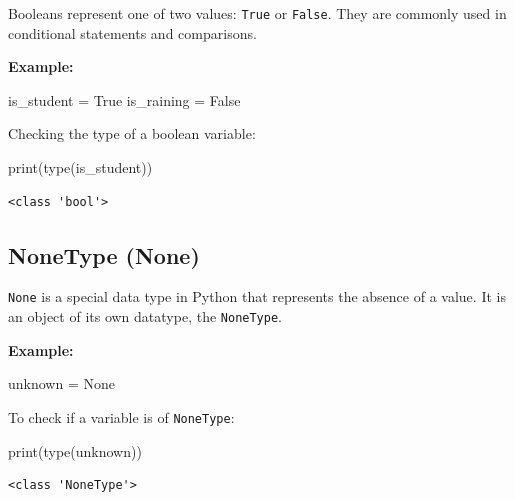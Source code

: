 \documentclass[
  letterpaper,
  DIV=11,
  numbers=noendperiod]{scrreprt}
\newenvironment{Shaded}{\begin{snugshade}}{\end{snugshade}}
\newcommand{\BuiltInTok}[1]{\textcolor[rgb]{0.00,0.23,0.31}{#1}}
\newcommand{\NormalTok}[1]{\textcolor[rgb]{0.00,0.23,0.31}{#1}}
\newcommand{\OperatorTok}[1]{\textcolor[rgb]{0.37,0.37,0.37}{#1}}
\newcommand{\VariableTok}[1]{\textcolor[rgb]{0.07,0.07,0.07}{#1}}
\begin{document}
Booleans represent one of two values: \texttt{True} or \texttt{False}.
They are commonly used in conditional statements and comparisons.

\textbf{Example:}

\begin{Shaded}
\begin{Highlighting}[]
\NormalTok{is\_student }\OperatorTok{=} \VariableTok{True}
\NormalTok{is\_raining }\OperatorTok{=} \VariableTok{False}
\end{Highlighting}
\end{Shaded}

Checking the type of a boolean variable:

\begin{Shaded}
\begin{Highlighting}[]
\BuiltInTok{print}\NormalTok{(}\BuiltInTok{type}\NormalTok{(is\_student)) }
\end{Highlighting}
\end{Shaded}

\begin{verbatim}
<class 'bool'>
\end{verbatim}

\hypertarget{nonetype-none}{%
\subsection{NoneType (None)}\label{nonetype-none}}

\texttt{None} is a special data type in Python that represents the
absence of a value. It is an object of its own datatype, the
\texttt{NoneType}.

\textbf{Example:}

\begin{Shaded}
\begin{Highlighting}[]
\NormalTok{unknown }\OperatorTok{=} \VariableTok{None}
\end{Highlighting}
\end{Shaded}

To check if a variable is of \texttt{NoneType}:

\begin{Shaded}
\begin{Highlighting}[]
\BuiltInTok{print}\NormalTok{(}\BuiltInTok{type}\NormalTok{(unknown))}
\end{Highlighting}
\end{Shaded}

\begin{verbatim}
<class 'NoneType'>
\end{verbatim}
\end{document}
